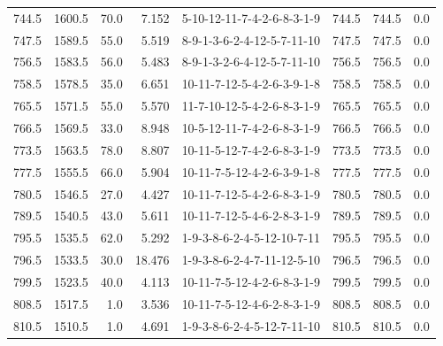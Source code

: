 \begin{tabular}{rrrrlrrr}
 744.5 &  1600.5 &           70.0 &              7.152 &  5-10-12-11-7-4-2-6-8-3-1-9 &         744.5 &           744.5 &       0.0 \\
 747.5 &  1589.5 &           55.0 &              5.519 &  8-9-1-3-6-2-4-12-5-7-11-10 &         747.5 &           747.5 &       0.0 \\
 756.5 &  1583.5 &           56.0 &              5.483 &  8-9-1-3-2-6-4-12-5-7-11-10 &         756.5 &           756.5 &       0.0 \\
 758.5 &  1578.5 &           35.0 &              6.651 &  10-11-7-12-5-4-2-6-3-9-1-8 &         758.5 &           758.5 &       0.0 \\
 765.5 &  1571.5 &           55.0 &              5.570 &  11-7-10-12-5-4-2-6-8-3-1-9 &         765.5 &           765.5 &       0.0 \\
 766.5 &  1569.5 &           33.0 &              8.948 &  10-5-12-11-7-4-2-6-8-3-1-9 &         766.5 &           766.5 &       0.0 \\
 773.5 &  1563.5 &           78.0 &              8.807 &  10-11-5-12-7-4-2-6-8-3-1-9 &         773.5 &           773.5 &       0.0 \\
 777.5 &  1555.5 &           66.0 &              5.904 &  10-11-7-5-12-4-2-6-3-9-1-8 &         777.5 &           777.5 &       0.0 \\
 780.5 &  1546.5 &           27.0 &              4.427 &  10-11-7-12-5-4-2-6-8-3-1-9 &         780.5 &           780.5 &       0.0 \\
 789.5 &  1540.5 &           43.0 &              5.611 &  10-11-7-12-5-4-6-2-8-3-1-9 &         789.5 &           789.5 &       0.0 \\
 795.5 &  1535.5 &           62.0 &              5.292 &  1-9-3-8-6-2-4-5-12-10-7-11 &         795.5 &           795.5 &       0.0 \\
 796.5 &  1533.5 &           30.0 &             18.476 &  1-9-3-8-6-2-4-7-11-12-5-10 &         796.5 &           796.5 &       0.0 \\
 799.5 &  1523.5 &           40.0 &              4.113 &  10-11-7-5-12-4-2-6-8-3-1-9 &         799.5 &           799.5 &       0.0 \\
 808.5 &  1517.5 &            1.0 &              3.536 &  10-11-7-5-12-4-6-2-8-3-1-9 &         808.5 &           808.5 &       0.0 \\
 810.5 &  1510.5 &            1.0 &              4.691 &  1-9-3-8-6-2-4-5-12-7-11-10 &         810.5 &           810.5 &       0.0 \\

\end{tabular}
